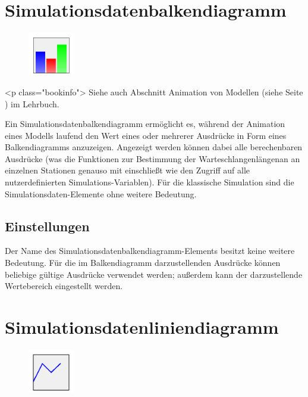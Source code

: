\section{Simulationsdatenbalkendiagramm}
\label{ref:ModelElementAnimationBarChart}

\begin{figure}
\vspace{-22pt}
\includegraphics[width=2cm]{imageModelElementAnimationBarChart.png}
\vspace{-22pt}
\end{figure}

<p class="bookinfo">
Siehe auch Abschnitt Animation von Modellen (siehe Seite \pageref{ref:book:5.4.3}) im Lehrbuch.

Ein Simulationsdatenbalkendiagramm ermöglicht es, während der Animation eines Modells laufend den Wert
eines oder mehrerer Ausdrücke in Form eines Balkendiagramms anzuzeigen.
Angezeigt werden können dabei alle berechenbaren Ausdrücke (was die Funktionen zur Bestimmung der
Warteschlangenlängenan an einzelnen Stationen genauso mit einschließt wie den Zugriff auf alle
nutzerdefinierten Simulations-Variablen). Für die klassische Simulation sind die
Simulationsdaten-Elemente ohne weitere Bedeutung.

\subsection*{Einstellungen}

Der Name des Simulationsdatenbalkendiagramm-Elements besitzt keine weitere Bedeutung. Für die im
Balkendiagramm darzustellenden Ausdrücke können beliebige gültige Ausdrücke verwendet werden;
außerdem kann der darzustellende Wertebereich eingestellt werden.


\section{Simulationsdatenliniendiagramm}
\label{ref:ModelElementAnimationDiagram}

\begin{figure}
\vspace{-22pt}
\includegraphics[width=2cm]{imageModelElementAnimationDiagram.png}
\vspace{-22pt}
\end{figure}

